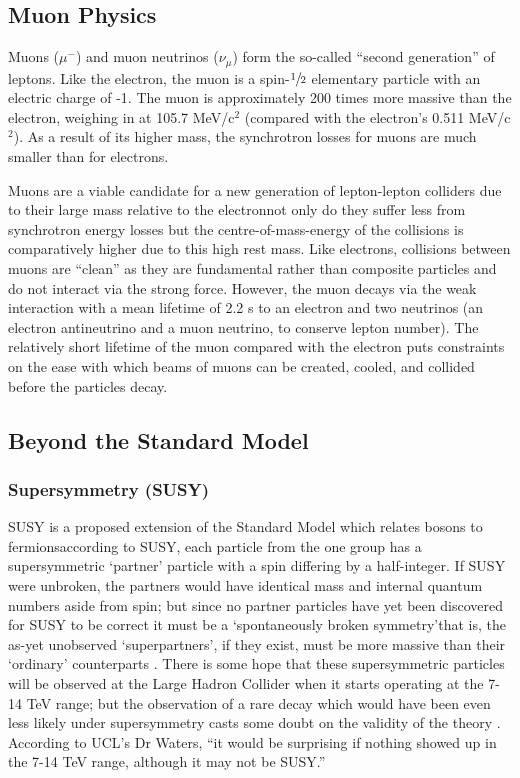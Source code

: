 \subsection{Muon Physics}
Muons ($\mu^{-}$) and muon neutrinos ($\nu_{\mu}$) form the so-called ``second generation'' of leptons. Like the electron, the muon is a spin-$\sfrac{1}{2}$ elementary particle with an electric charge of -1. The muon is approximately 200 times more massive than the electron, weighing in at 105.7 MeV/c$^{2}$ (compared with the electron's 0.511 MeV/c$^{2}$). As a result of its higher mass, the synchrotron losses for muons are much smaller than for electrons.

Muons are a viable candidate for a new generation of lepton-lepton colliders due to their large mass relative to the electron\textemdash not only do they suffer less from synchrotron energy losses but the centre-of-mass-energy of the collisions is comparatively higher due to this high rest mass. Like electrons, collisions between muons are ``clean'' as they are fundamental rather than composite particles and do not interact via the strong force. However,  the muon decays via the weak interaction with a mean lifetime of 2.2 \textmu s to an electron and two neutrinos (an electron antineutrino and a muon neutrino, to conserve lepton number). The relatively short lifetime of the muon compared with the electron puts constraints on the ease with which beams of muons can be created, cooled, and collided before the particles decay.

\subsection{Beyond the Standard Model}
\subsubsection{Supersymmetry (SUSY)}
SUSY is a proposed extension of the Standard Model which relates bosons to fermions\textemdash according to SUSY, each particle from the one group has a supersymmetric ‘partner' particle with a spin differing by a half-integer. If SUSY were unbroken, the partners would have identical mass and internal quantum numbers aside from spin; but since no partner particles have yet been discovered for SUSY to be correct it must be a ‘spontaneously broken symmetry'\textemdash that is, the as-yet unobserved ‘superpartners', if they exist, must be more massive than their ‘ordinary' counterparts \cite{CERN:Supersymmetry}. There is some hope that these supersymmetric particles will be observed at the Large Hadron Collider when it starts operating at the 7-14 TeV range; but the observation of a rare decay which would have been even less likely under supersymmetry casts some doubt on the validity of the theory \cite{BBC:SUSY}. According to UCL's Dr Waters, ``it would be surprising if nothing showed up in the 7-14 TeV range, although it may not be SUSY.'' \cite{Waters:Interview}

